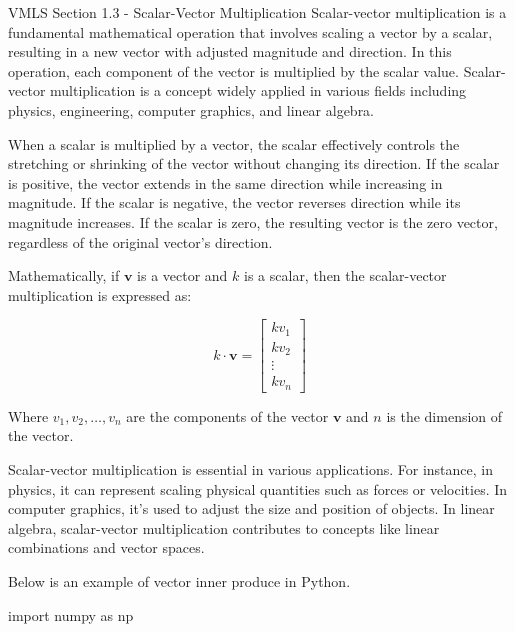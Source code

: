 \begin{notes}{VMLS Section 1.3 - Scalar-Vector Multiplication}
    Scalar-vector multiplication is a fundamental mathematical operation that involves scaling a vector by a scalar, resulting in a new vector with adjusted magnitude and direction. In this operation, each component of 
    the vector is multiplied by the scalar value. Scalar-vector multiplication is a concept widely applied in various fields including physics, engineering, computer graphics, and linear algebra.

    When a scalar is multiplied by a vector, the scalar effectively controls the stretching or shrinking of the vector without changing its direction. If the scalar is positive, the vector extends in the same direction 
    while increasing in magnitude. If the scalar is negative, the vector reverses direction while its magnitude increases. If the scalar is zero, the resulting vector is the zero vector, regardless of the original vector's 
    direction.

    \begin{highlight}
        Mathematically, if \(\mathbf{v}\) is a vector and \(k\) is a scalar, then the scalar-vector multiplication is expressed as:
    
        \[
        k \cdot \mathbf{v} = \begin{bmatrix} kv_1 \\ kv_2 \\ \vdots \\ kv_n \end{bmatrix}
        \]
    
        Where \(v_1, v_2, \ldots, v_n\) are the components of the vector \(\mathbf{v}\) and \(n\) is the dimension of the vector.
    \end{highlight}

    Scalar-vector multiplication is essential in various applications. For instance, in physics, it can represent scaling physical quantities such as forces or velocities. In computer graphics, it's used to adjust the size 
    and position of objects. In linear algebra, scalar-vector multiplication contributes to concepts like linear combinations and vector spaces.

    \begin{highlight}
        Below is an example of vector inner produce in Python.

    \begin{code}[Python]
    import numpy as np


\end{code}
\end{highlight}
\end{notes}
